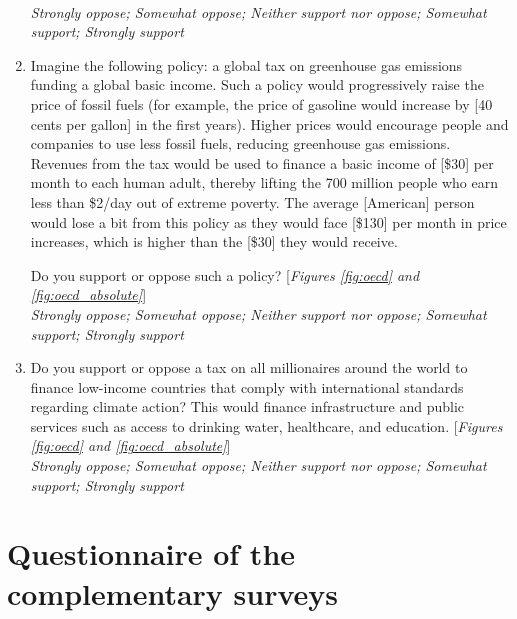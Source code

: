 \begin{enumerate}
\\ \textit{Strongly oppose; Somewhat oppose; Neither support nor oppose; Somewhat support; Strongly support}
\item Imagine the following policy: a global tax on greenhouse gas emissions funding a global basic income. 
Such a policy would progressively raise the price of fossil fuels (for example, the price of gasoline would increase by [40 cents per gallon] in the first years). Higher prices would encourage people and companies to use less fossil fuels, reducing greenhouse gas emissions. Revenues from the tax would be used to finance a basic income of [\$30] per month to each human adult, thereby lifting the 700 million people who earn less than \$2/day out of extreme poverty. 
The average [American] person would lose a bit from this policy as they would face [\$130] per month in price increases, which is higher than the [\$30] they would receive.

Do you support or oppose such a policy?  [\textit{Figures \ref{fig:oecd} and \ref{fig:oecd_absolute}}]
\\ \textit{Strongly oppose; Somewhat oppose; Neither support nor oppose; Somewhat support; Strongly support}
\item \label{q:millionaire_tax} Do you support or oppose a tax on all millionaires around the world to finance low-income countries that comply with international standards regarding climate action? 
This would finance infrastructure and public services such as access to drinking water, healthcare, and education. [\textit{Figures \ref{fig:oecd} and \ref{fig:oecd_absolute}}]
\\ \textit{Strongly oppose; Somewhat oppose; Neither support nor oppose; Somewhat support; Strongly support}
\end{enumerate}



\renewcommand{\theenumi}{\arabic{enumi}}
\clearpage
\section{Questionnaire of the complementary surveys}\label{app:questionnaire}



